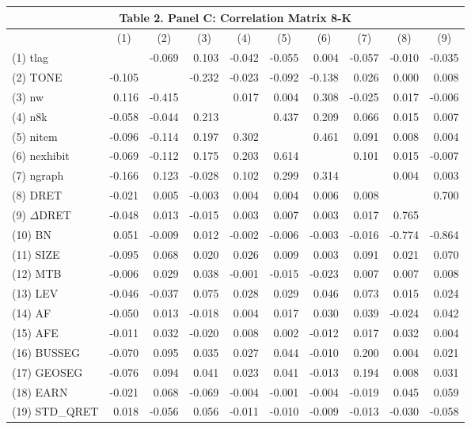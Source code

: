 \begin{table}[H] \label{T2PC}
	\centering
	\begin{tabular}{lrrrrrrrrr}
		\multicolumn{10}{c}{\textbf{Table 2. Panel C: Correlation Matrix 8-K}} \\
		\midrule
		\midrule
		& \multicolumn{1}{c}{(1)} & \multicolumn{1}{c}{(2)} & \multicolumn{1}{c}{(3)} & \multicolumn{1}{c}{(4)} & \multicolumn{1}{c}{(5)} & \multicolumn{1}{c}{(6)} & \multicolumn{1}{c}{(7)} & \multicolumn{1}{c}{(8)} & \multicolumn{1}{c}{(9)}\\
		\midrule
		(1) tlag &  & -0.069 & 0.103 & -0.042 & -0.055 & 0.004 & -0.057 & -0.010 & -0.035 \\
		(2) TONE & -0.105 &  & -0.232 & -0.023 & -0.092 & -0.138 & 0.026 & 0.000 & 0.008 \\
		(3) nw & 0.116 & -0.415 &  & 0.017 & 0.004 & 0.308 & -0.025 & 0.017 & -0.006 \\
		(4) n8k & -0.058 & -0.044 & 0.213 &  & 0.437 & 0.209 & 0.066 & 0.015 & 0.007 \\
		(5) nitem & -0.096 & -0.114 & 0.197 & 0.302 &  & 0.461 & 0.091 & 0.008 & 0.004 \\
		(6) nexhibit & -0.069 & -0.112 & 0.175 & 0.203 & 0.614 &  & 0.101 & 0.015 & -0.007 \\
		(7) ngraph & -0.166 & 0.123 & -0.028 & 0.102 & 0.299 & 0.314 & & 0.004 & 0.003 \\
		(8) DRET & -0.021 & 0.005 & -0.003 & 0.004 & 0.004 & 0.006 & 0.008 &  & 0.700 \\
		(9) $\Delta$DRET & -0.048 & 0.013 & -0.015 & 0.003 & 0.007 & 0.003 & 0.017 & 0.765 &  \\
		(10) BN & 0.051 & -0.009 & 0.012 & -0.002 & -0.006 & -0.003 & -0.016 & -0.774 & -0.864 \\
		(11) SIZE & -0.095 & 0.068 & 0.020 & 0.026 & 0.009 & 0.003 & 0.091 & 0.021 & 0.070 \\
		(12) MTB & -0.006 & 0.029 & 0.038 & -0.001 & -0.015 & -0.023 & 0.007 & 0.007 & 0.008 \\
		(13) LEV & -0.046 & -0.037 & 0.075 & 0.028 & 0.029 & 0.046 & 0.073 & 0.015 & 0.024 \\
		(14) AF & -0.050 & 0.013 & -0.018 & 0.004 & 0.017 & 0.030 & 0.039 & -0.024 & 0.042 \\
		(15) AFE & -0.011 & 0.032 & -0.020 & 0.008 & 0.002 & -0.012 & 0.017 & 0.032 & 0.004 \\
		(16) BUSSEG & -0.070 & 0.095 & 0.035 & 0.027 & 0.044 & -0.010 & 0.200 & 0.004 & 0.021 \\
		(17) GEOSEG & -0.076 & 0.094 & 0.041 & 0.023 & 0.041 & -0.013 & 0.194 & 0.008 & 0.031 \\
		(18) EARN & -0.021 & 0.068 & -0.069 & -0.004 & -0.001 & -0.004 & -0.019 & 0.045 & 0.059 \\
		(19) STD\_QRET & 0.018 & -0.056 & 0.056 & -0.011 & -0.010 & -0.009 & -0.013 & -0.030 & -0.058 \\
		\bottomrule
		\bottomrule
	\end{tabular}%
\end{table}%
